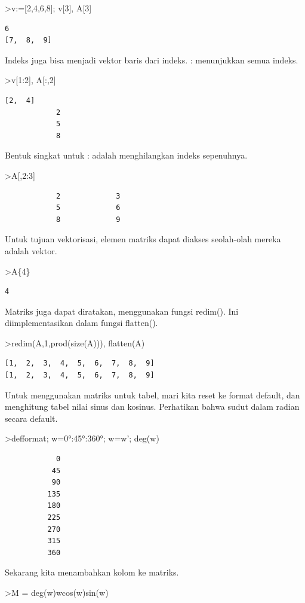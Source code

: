 \documentclass[
]{book}
\begin{document}
\textgreater v:={[}2,4,6,8{]}; v{[}3{]}, A{[}3{]}

\begin{verbatim}
6
[7,  8,  9]
\end{verbatim}

Indeks juga bisa menjadi vektor baris dari indeks. : menunjukkan semua indeks.

\textgreater v{[}1:2{]}, A{[}:,2{]}

\begin{verbatim}
[2,  4]
            2 
            5 
            8 
\end{verbatim}

Bentuk singkat untuk : adalah menghilangkan indeks sepenuhnya.

\textgreater A{[},2:3{]}

\begin{verbatim}
            2             3 
            5             6 
            8             9 
\end{verbatim}

Untuk tujuan vektorisasi, elemen matriks dapat diakses seolah-olah mereka adalah vektor.

\textgreater A\{4\}

\begin{verbatim}
4
\end{verbatim}

Matriks juga dapat diratakan, menggunakan fungsi redim(). Ini diimplementasikan dalam fungsi flatten().

\textgreater redim(A,1,prod(size(A))), flatten(A)

\begin{verbatim}
[1,  2,  3,  4,  5,  6,  7,  8,  9]
[1,  2,  3,  4,  5,  6,  7,  8,  9]
\end{verbatim}

Untuk menggunakan matriks untuk tabel, mari kita reset ke format default, dan menghitung tabel nilai sinus dan kosinus. Perhatikan bahwa sudut dalam radian secara default.

\textgreater defformat; w=0°:45°:360°; w=w'; deg(w)

\begin{verbatim}
            0 
           45 
           90 
          135 
          180 
          225 
          270 
          315 
          360 
\end{verbatim}

Sekarang kita menambahkan kolom ke matriks.

\textgreater M = deg(w)\textbar w\textbar cos(w)\textbar sin(w)
\end{document}
